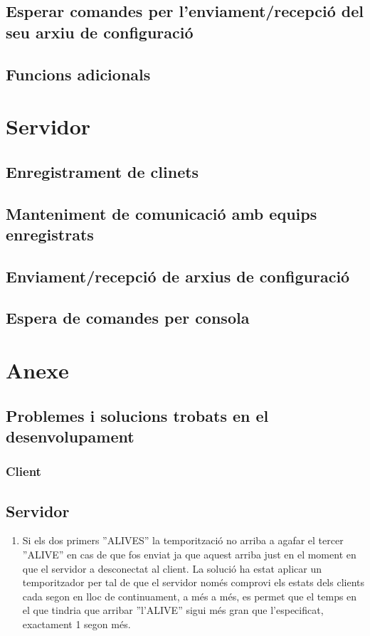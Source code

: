 \documentclass[11pt]{article}
\begin{document}
	\subsection{Esperar comandes per l'enviament/recepció del seu arxiu de configuració}
	\subsection{Funcions adicionals}
	
\section{Servidor}
	\subsection{Enregistrament de clinets}
	\subsection{Manteniment de comunicació amb equips enregistrats }
	\subsection{Enviament/recepció de arxius de configuració}
	\subsection{Espera de comandes per consola}
\section{Anexe}
	\subsection{Problemes i solucions trobats en el desenvolupament}
		\subsubsection*{Client}
		\subsection*{Servidor}
\begin{enumerate}
\item Si els dos primers ''ALIVES'' la temporització no arriba a agafar el tercer ''ALIVE'' en cas de que fos enviat ja que aquest arriba just en el moment en que el servidor a desconectat al client. La solució ha estat aplicar un temporitzador per tal de que el servidor només comprovi els estats dels clients cada segon en lloc de continuament, a més a més, es permet que el temps en el que tindria que arribar ''l'ALIVE'' sigui més gran que l'especificat, exactament 1 segon més.
\end{enumerate}
\newpage
\end{document}
